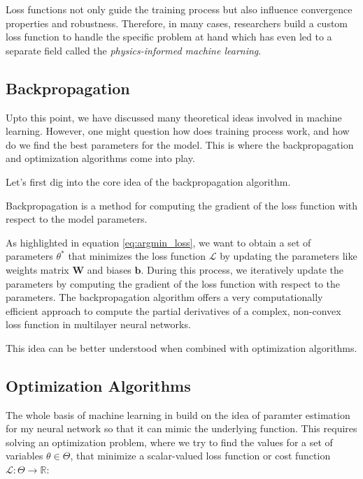 Loss functions not only guide the training process but also influence convergence properties and robustness. Therefore, in many cases, researchers build a custom loss function to handle the specific problem at hand which has even led to a separate field called the \textit{physics-informed machine learning}. 

\subsection{Backpropagation}

Upto this point, we have discussed many theoretical ideas involved in machine learning. However, one might question how does training process work, and how do we find the best parameters for the model. This is where the backpropagation and optimization algorithms come into play.

Let's first dig into the core idea of the backpropagation algorithm. 

\begin{tcolorbox}[colback=red!5!white, colframe=red!75!black]
    Backpropagation is a method for computing the gradient of the loss function with respect to the model parameters.
\end{tcolorbox}

As highlighted in equation \ref{eq:argmin_loss}, we want to obtain a set of parameters $\theta^*$ that minimizes the loss function $\mathcal{L}$ by updating the parameters like weights matrix $\textbf{W}$ and biases $\textbf{b}$. During this process, we iteratively update the parameters by computing the gradient of the loss function with respect to the parameters. The backpropagation algorithm offers a very computationally efficient approach to compute the partial derivatives of a complex, non-convex loss function in multilayer neural networks.  

This idea can be better understood when combined with optimization algorithms.

\subsection{Optimization Algorithms}

The whole basis of machine learning in build on the idea of paramter estimation for my neural network so that it can mimic the underlying function. This requires solving an optimization problem, where we try to find the values for a set of variables $\theta \in \Theta$, that minimize a scalar-valued loss function or cost function $\mathcal{L} : \Theta \rightarrow \mathbb{R}$:

